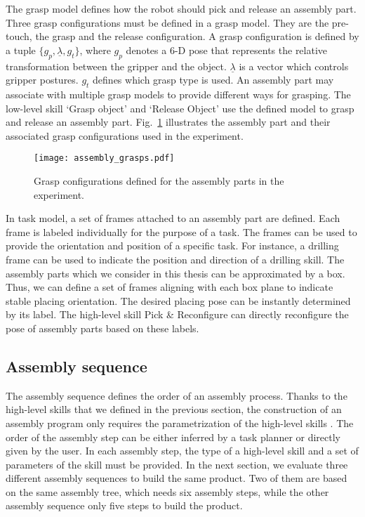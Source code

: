 The grasp model defines how the robot should pick and release an assembly part. Three grasp configurations must be defined in a grasp model. They are the pre-touch, the grasp and the release configuration. A grasp configuration is defined by a tuple $\{g_p, \underline{\lambda}, g_t \}$, where $g_p$ denotes a 6-D pose that represents the relative transformation between the gripper and the object. $\underline{\lambda}$ is a vector which controls gripper postures. $g_t$ defines which grasp type is used. An assembly part may associate with multiple grasp models to provide different ways for grasping. The low-level skill `Grasp object' and `Release Object' use the defined model to grasp and release an assembly part. Fig.~\ref{fig:assembly_grasps} illustrates the assembly part and their associated grasp configurations used in the experiment.

\begin{figure}[!htbp]
\centering
\texttt{[image: assembly\_grasps.pdf]}
\captionsetup{justification=raggedright}
\caption{Grasp configurations defined for the assembly parts in the experiment.}
\label{fig:assembly_grasps}
\end{figure}


 In task model, a set of frames attached to an assembly part are defined. Each frame is labeled individually for the purpose of a task. The frames can be used to provide the orientation and position of a specific task. For instance, a drilling frame can be used to indicate the position and direction of  a drilling skill.  The assembly parts which we consider in this thesis can be approximated by a box. Thus, we can define a set of frames aligning with each box plane to indicate stable placing orientation. The desired placing pose can be instantly determined by its label. The high-level skill Pick \& Reconfigure can directly reconfigure the pose of assembly parts based on these labels. 

\subsection{Assembly sequence}
The assembly sequence defines the order of an assembly process. Thanks to the high-level skills that we defined in the previous section, the construction of an assembly program only requires the parametrization of the high-level skills . The order of the assembly step can be either inferred by a task planner or directly given by the user. In each assembly step, the type of a high-level skill and a set of parameters of the skill must be provided. In the next section, we evaluate three different assembly sequences to build the same product. Two of them are based on the same assembly tree, which needs six assembly steps, while the other assembly sequence only five steps to build the product. 

